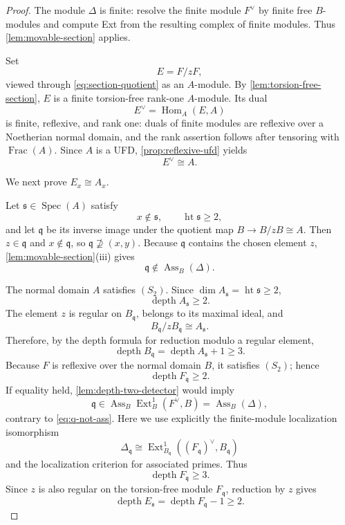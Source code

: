 \documentclass[reqno]{amsart}
\theoremstyle{plain}
\theoremstyle{definition}
\newcommand{\Spec}{\operatorname{Spec}}
\newcommand{\Ass}{\operatorname{Ass}}
\newcommand{\depth}{\operatorname{depth}}
\newcommand{\Ext}{\operatorname{Ext}}
\newcommand{\Hom}{\operatorname{Hom}}
\newcommand{\Frac}{\operatorname{Frac}}
\newcommand{\htp}{\operatorname{ht}}
\begin{document}
\begin{proof}
The module $\Delta$ is finite: resolve the finite module $F^\vee$ by
finite free $B$-modules and compute Ext from the resulting complex of
finite modules.  Thus \cref{lem:movable-section} applies.

Set
\[
 E=F/zF,
\]
viewed through \eqref{eq:section-quotient} as an $A$-module.  By
\cref{lem:torsion-free-section}, $E$ is a finite torsion-free rank-one
$A$-module.  Its dual
\[
 E^\vee=\Hom_A(E,A)
\]
is finite, reflexive, and rank one: duals of finite modules are reflexive over
a Noetherian normal domain, and the rank assertion follows after tensoring
with $\Frac(A)$.  Since $A$ is a UFD,
\cref{prop:reflexive-ufd} yields
\begin{equation}
\label{eq:E-dual-free}
 E^\vee\cong A.
\end{equation}

We next prove $E_x\cong A_x$.

Let $\mathfrak s\in\Spec(A)$ satisfy
\[
 x\notin\mathfrak s,
 \qquad \htp\mathfrak s\geq2,
\]
and let $\mathfrak q$ be its inverse image under the quotient map
$B\to B/zB\cong A$.  Then $z\in\mathfrak q$ and $x\notin\mathfrak q$,
so $\mathfrak q\not\supseteq(x,y)$.  Because $\mathfrak q$ contains the
chosen element $z$, \cref{lem:movable-section}(iii) gives
\begin{equation}
\label{eq:q-not-ass}
 \mathfrak q\notin\Ass_B(\Delta).
\end{equation}

The normal domain $A$ satisfies $(S_2)$.  Since
$\dim A_{\mathfrak s}=\htp\mathfrak s\geq2$,
\[
 \depth A_{\mathfrak s}\geq2.
\]
The element $z$ is regular on $B_{\mathfrak q}$, belongs to its maximal
ideal, and
\[
 B_{\mathfrak q}/zB_{\mathfrak q}\cong A_{\mathfrak s}.
\]
Therefore, by the depth formula for reduction modulo a regular element,
\[
 \depth B_{\mathfrak q}
 =\depth A_{\mathfrak s}+1\geq3.
\]
Because $F$ is reflexive over the normal domain $B$, it satisfies
$(S_2)$; hence
\[
 \depth F_{\mathfrak q}\geq2.
\]
If equality held, \cref{lem:depth-two-detector} would imply
\[
 \mathfrak q\in\Ass_B\Ext^1_B(F^\vee,B)
 =\Ass_B(\Delta),
\]
contrary to \eqref{eq:q-not-ass}.  Here we use explicitly the finite-module
localization isomorphism
\[
 \Delta_{\mathfrak q}\cong
 \Ext^1_{B_{\mathfrak q}}
 ((F_{\mathfrak q})^\vee,B_{\mathfrak q})
\]
and the localization criterion for associated primes.  Thus
\[
 \depth F_{\mathfrak q}\geq3.
\]
Since $z$ is also regular on the torsion-free module $F_{\mathfrak q}$,
reduction by $z$ gives
\begin{equation}
\label{eq:E-depth-away-x}
 \depth E_{\mathfrak s}
 =\depth F_{\mathfrak q}-1\geq2.
\end{equation}


\end{proof}
\end{document}
